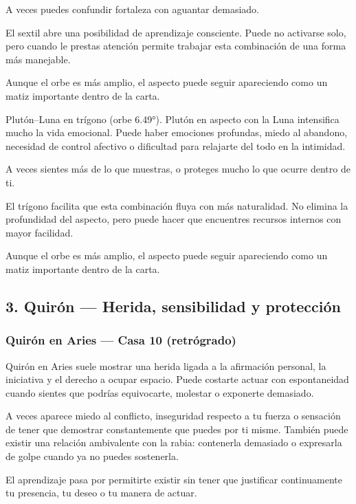 \documentclass[11pt,a4paper]{article}
\begin{document}
A veces puedes confundir fortaleza con aguantar demasiado.

El sextil abre una posibilidad de aprendizaje consciente. Puede no activarse solo, pero cuando le prestas atención permite trabajar esta combinación de una forma más manejable.

Aunque el orbe es más amplio, el aspecto puede seguir apareciendo como un matiz importante dentro de la carta.

Plutón–Luna en trígono (orbe 6.49°).
Plutón en aspecto con la Luna intensifica mucho la vida emocional. Puede haber emociones profundas, miedo al abandono, necesidad de control afectivo o dificultad para relajarte del todo en la intimidad.

A veces sientes más de lo que muestras, o proteges mucho lo que ocurre dentro de ti.

El trígono facilita que esta combinación fluya con más naturalidad. No elimina la profundidad del aspecto, pero puede hacer que encuentres recursos internos con mayor facilidad.

Aunque el orbe es más amplio, el aspecto puede seguir apareciendo como un matiz importante dentro de la carta.

\vspace{0.4cm}

\subsection{3. Quirón — Herida, sensibilidad y protección}

\subsubsection*{Quirón en Aries — Casa 10 (retrógrado)}

Quirón en Aries suele mostrar una herida ligada a la afirmación personal, la iniciativa y el derecho a ocupar espacio. Puede costarte actuar con espontaneidad cuando sientes que podrías equivocarte, molestar o exponerte demasiado.

A veces aparece miedo al conflicto, inseguridad respecto a tu fuerza o sensación de tener que demostrar constantemente que puedes por ti misme. También puede existir una relación ambivalente con la rabia: contenerla demasiado o expresarla de golpe cuando ya no puedes sostenerla.

El aprendizaje pasa por permitirte existir sin tener que justificar continuamente tu presencia, tu deseo o tu manera de actuar.
\end{document}
